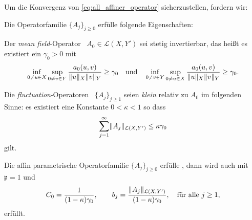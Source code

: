Um die Konvergenz von \eqref{eq:all_affiner_operator} sicherzustellen, fordern wir:

\begin{Annahme}
    \label{thm:kunoth:assumption2}
    Die Operatorfamilie $\{ A_{j} \}_{j \geq 0}$ erfülle folgende Eigenschaften:
    \begin{thmenumerate}
        \item Der \emph{mean field}-Operator ~$A_{0} \in \mathcal L(X, Y')$ sei stetig invertierbar, das heißt es existiert ein $\gamma_{0} > 0$ mit
        \begin{equation}
            \label{eq:kunoth:ass2_gamma_0}
            \inf_{0 \neq u \in X} \sup_{0 \neq v \in Y} \frac{a_{0}(u, v)}{\lVert u\rVert_{X} \lVert v\rVert_{Y}} \geq \gamma_{0}
            \quad \text{und} \quad
            \inf_{0 \neq v \in Y} \sup_{0 \neq u \in X} \frac{a_{0}(u, v)}{\lVert u\rVert_{X} \lVert v\rVert_{Y}} \geq \gamma_{0}.
        \end{equation}
        \item Die \emph{fluctuation}-Operatoren ~$\{ A_{j} \}_{j \geq 1}$ seien \emph{klein} relativ zu $A_{0}$ im folgenden Sinne: es existiert eine Konstante $0 < \kappa < 1$ so dass
        \begin{equation}
            \sum_{j = 1}^{\infty} \lVert A_{j}\rVert_{\mathcal L(X, Y')} \leq \kappa \gamma_{0}
        \end{equation}
        gilt.
    \end{thmenumerate}
\end{Annahme}

\begin{Korollar}
    \label{thm:kunoth:corollary3}
    Die affin parametrische Operatorfamilie $\{ A_{j} \}_{j \geq 0}$ erfülle , dann wird auch  mit $\mathfrak p = 1$ und
    \begin{equation}
        C_{0} = \frac{1}{(1 - \kappa) \gamma_{0}}, \qquad b_{j} = \frac{\lVert A_{j}\rVert_{\mathcal L(X, Y')}}{(1 - \kappa) \gamma_{0}}, \quad \text{für alle}~j \geq 1,
    \end{equation}
    erfüllt.
\end{Korollar}

